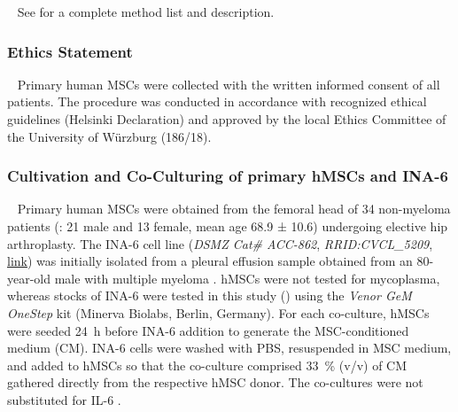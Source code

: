 \newpage


\label{C1:methods}
\ %
See  for a complete method list and description.


\subsubsection*{Ethics Statement}
\ %
Primary human MSCs were collected with the written informed consent of all
patients. The procedure was conducted in accordance with recognized ethical
guidelines (Helsinki Declaration) and approved by the local Ethics Committee of
the University of Würzburg (186/18).



\subsubsection*{Cultivation and Co-Culturing of primary hMSCs and INA-6}
\ %
Primary human MSCs were obtained from the femoral head of 34 non-myeloma
patients (: 21 male and 13 female, mean age
68.9 ± 10.6) undergoing elective hip arthroplasty. The INA-6 cell line
(\textit{DSMZ Cat\# ACC-862}, \textit{RRID:CVCL\_5209},
\href{https://www.cellosaurus.org/CVCL_5209}{link}) was initially isolated from
a pleural effusion sample obtained from an 80-year-old male with multiple
myeloma \cite{burgerGp130RasMediated2001c,gramatzkiTwoNewInterleukin61994}.
hMSCs were not tested for mycoplasma, whereas stocks of INA-6 were tested in
this study () using the \textit{Venor GeM OneStep} kit
(Minerva Biolabs, Berlin, Germany). For each co-culture, hMSCs were seeded
\SI{24}{\hour} before INA-6 addition to generate the MSC-conditioned medium
(CM). INA-6 cells were washed with PBS, resuspended in MSC medium, and added to
hMSCs so that the co-culture comprised \SI{33}{\percent} (v/v) of CM gathered
directly from the respective hMSC donor. The co-cultures were not substituted
for IL-6 \cite{chatterjeePresenceBoneMarrow2002}.





